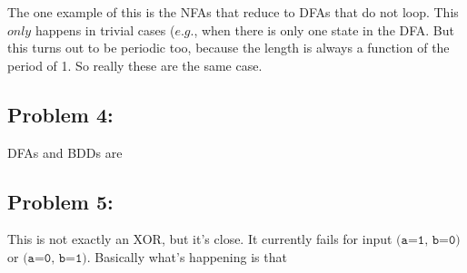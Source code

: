 \documentclass[a4paper]{article}
\begin{document}
The one example of this is the NFAs that reduce to DFAs that do not loop. This $\textit{only}$ happens in trivial cases ($\textit{e.g.}$, when there is only one state in the DFA. But this turns out to be periodic too, because the length is always a function of the period of 1. So really these are the same case.

\subsection*{Problem 4:}

DFAs and BDDs are

\subsection*{Problem 5:}

This is not exactly an XOR, but it's close. It currently fails for input $\texttt{(a=1, b=0)}$ or $\texttt{(a=0, b=1)}$. Basically what's happening is that 
\end{document}
